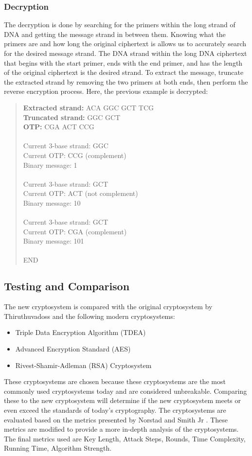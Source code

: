 \subsubsection{Decryption}
The decryption is done by searching for the primers within the long strand of DNA and getting the message strand in between them. Knowing what the primers are and how long the original ciphertext is allows us to accurately search for the desired message strand. The DNA strand within the long DNA ciphertext that begins with the start primer, ends with the end primer, and has the length of the original ciphertext is the desired strand. To extract the message, truncate the extracted strand by removing the two primers at both ends, then perform the reverse encryption process. Here, the previous example is decrypted:
\begin{quote}
\textbf{Extracted strand:} ACA GGC GCT TCG\\
\textbf{Truncated strand:} GGC GCT\\
\textbf{OTP:} CGA ACT CCG\\
\\
Current 3-base strand: GGC\\
Current OTP: CCG (complement)\\
Binary message: 1\\
\\
Current 3-base strand: GCT\\
Current OTP: ACT (not complement)\\
Binary message: 10\\
\\
Current 3-base strand: GCT\\
Current OTP: CGA (complement)\\
Binary message: 101\\
\\
END
\end{quote}

\subsection{Testing and Comparison}
The new cryptosystem is compared with the original cryptosystem by Thiruthuvadoss and the following modern cryptosystems:
\begin{itemize}
    \item Triple Data Encryption Algorithm (TDEA)
    \item Advanced Encryption Standard (AES)
    \item Rivest-Shamir-Adleman (RSA) Cryptosystem
\end{itemize}
These cryptosystems are chosen because these cryptosystems are the most commonly used cryptosystems today and are considered unbreakable. Comparing these to the new cryptosystem will determine if the new cryptosystem meets or even exceed the standards of today's cryptography. The cryptosystems are evaluated based on the metrics presented by Norstad and Smith Jr \cite{metrics}. These metrics are modified to provide a more in-depth analysis of the cryptosystems. The final metrics used are Key Length, Attack Steps, Rounds, Time Complexity, Running Time, Algorithm Strength.

